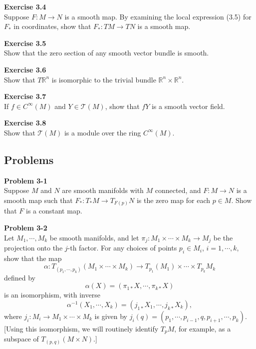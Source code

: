 \documentclass[12pt, a4paper]{article}
\theoremstyle{plain}
\newcommand{\R}{\mathbb{R}}
\newcommand{\T}{\mathcal{T}}
\newenvironment{exercise}[2][Exercise]
    { \begin{mdframed}[backgroundcolor=gray!20] \textbf{#1 #2} \\}
    {  \end{mdframed}}
\newenvironment{problem}[2][Problem]
    { \begin{mdframed}[backgroundcolor=gray!20] \textbf{#1 #2} \\}
    {  \end{mdframed}}
\begin{document}
\begin{exercise}{3.4}
    Suppose $F\colon M\to N$ is a smooth map. By examining the local expression (3.5) for $F_*$ in coordinates, show that $F_*\colon TM\to TN$ is a smooth map.
\end{exercise}

\begin{exercise}{3.5}
    Show that the zero section of any smooth vector bundle is smooth.
\end{exercise}

\begin{exercise}{3.6}
    Show that $T\R^n$ is isomorphic to the trivial bundle $\R^n\times \R^n$.
\end{exercise}

\begin{exercise}{3.7}
    If $f\in C^\infty(M)$ and $Y\in \T(M)$, show that $fY$ is a smooth vector field.
\end{exercise}

\begin{exercise}{3.8}
    Show that $\T(M)$ is a module over the ring $C^\infty(M)$.
\end{exercise}
\subsection{Problems}

\begin{problem}{3-1}
    Suppose $M$ and $N$ are smooth manifolds with $M$ connected, and $F\colon M\to N$ is a smooth map such that $F_*\colon T_*M\to T_{F(p)}N$ is the zero map for each $p\in M$. Show that $F$ is a constant map.
\end{problem}

\begin{problem}{3-2}
    Let $M_1,\cdots,M_k$ be smooth manifolds, and let $\pi_j\colon M_1\times\cdots\times M_k\to M_j$ be the projection onto the $j$-th factor. For any choices of points $p_i\in M_i$, $i=1,\cdots,k$, show that the map
    \[
    \alpha\colon T_{(p_1,\cdots,p_k)}(M_1\times\cdots\times M_k)\to T_{p_1}(M_1)\times\cdots\times T_{p_k}M_k
    \]
    defined by 
    \[
    \alpha(X)=(\pi_{1*}X,\cdots,\pi_{k*}X)
    \]
    is an isomorphism, with inverse
    \[
    \alpha^{-1}(X_1,\cdots,X_k)=(j_{1*}X_1,\cdots,j_{k*}X_k),
    \]
    where $j_i\colon M_i\to M_1\times\cdots\times M_k$ is given by $j_i(q)=(p_1,\cdots,p_{i-1},q,p_{i+1},\cdots ,p_k)$. [Using this isomorphism, we will routinely identify $T_pM$, for example, as a subspace of $T_{(p,q)}(M\times N)$.]
\end{problem}
\end{document}
